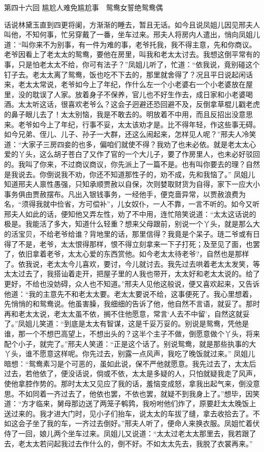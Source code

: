 \documentclass[12pt,oneside]{book}
\begin{document}
 
第四十六回  尴尬人难免尴尬事　鸳鸯女誓绝鸳鸯偶


话说林黛玉直到四更将阑，方渐渐的睡去，暂且无话。如今且说凤姐儿因见邢夫人叫他，不知何事，忙另穿戴了一番，坐车过来。邢夫人将房内人遣出，悄向凤姐儿道：“叫你来不为别事，有一件为难的事，老爷托我，我不得主意，先和你商议。老爷因看上了老太太的鸳鸯，要他在房里，叫我和老太太讨去。我想这倒平常有的事，只是怕老太太不给，你可有法子？”凤姐儿听了，忙道：“依我说，竟别碰这个钉子去。老太太离了鸳鸯，饭也吃不下去的，那里就舍得了？况且平日说起闲话来，老太太常说，老爷如今上了年纪，作什么左一个小老婆右一个小老婆放在屋里，没的耽误了人家。放着身子不保养，官儿也不好生作去，成日家和小老婆喝酒。太太听这话，很喜欢老爷么？这会子迥避还恐回避不及，反倒拿草棍儿戳老虎的鼻子眼儿去了！太太别恼，我是不敢去的。明放着不中用，而且反招出没意思来。老爷如今上了年纪，行事不妥，太太该劝才是。比不得年轻，作这些事无碍。如今兄弟、侄儿、儿子、孙子一大群，还这么闹起来，怎样见人呢？”邢夫人冷笑道：“大家子三房四妾的也多，偏咱们就使不得？我劝了也未必依。就是老太太心爱的丫头，这么胡子苍白了又作了官的一个大儿子，要了作房里人，也未必好驳回的。我叫了你来，不过商议商议，你先派上了一篇不是。也有叫你要去的理？自然是我说去。你倒说我不劝，你还不知道那性子的，劝不成，先和我恼了。”
凤姐儿知道邢夫人禀性愚强，只知承顺贾赦以自保，次则婪取财货为自得，家下一应大小事务俱由贾赦摆布。凡出入银钱事务，一经他手，便克啬异常，以贾赦浪费为名，“须得我就中俭省，方可偿补”，儿女奴仆，一人不靠，一言不听的。如今又听邢夫人如此的话，便知他又弄左性，劝了不中用，连忙陪笑说道：“太太这话说的极是。我能活了多大，知道什么轻重？想来父母跟前，别说一个丫头，就是那么大的活宝贝，不给老爷给谁？背地里的话，那里信得？我竟是个呆子。琏二爷或有日得了不是，老爷，太太恨得那样，恨不得立刻拿来一下子打死；及至见了面，也罢了，依旧拿着老爷，太太心爱的东西赏他。如今老太太待老爷?，自然也是那样了。依我说，老太太今儿喜欢，要讨，今儿就讨去。我先过去哄着老太太发笑，等太太过去了，我搭讪着走开，把屋子里的人我也带开，太太好和老太太说的。给了更好，不给也没妨碍，众人也不知道。”邢夫人见他这般说，便又喜欢起来，又告诉他道：“我的主意先不和老太太要。老太太要说不给，这事便死了。我心里想着，先悄悄的和鸳鸯说。他虽害臊，我细细的告诉了他，他自然不言语，就妥了。那时再和老太太说，老太太虽不依，搁不住他愿意，常言‘人去不中留’，自然这就妥了。”凤姐儿笑道：“到底是太太有智谋，这是千妥万妥的。别说是鸳鸯，凭他是谁，那一个不想巴高望上，不想出头的？这半个主子不做，倒愿意做个丫头，将来配个小子，就完了。”邢夫人笑道：“正是这个话了。别说鸳鸯，就是那些执事的大丫头，谁不愿意这样呢。你先过去，别露一点风声，我吃了晚饭就过来。”
凤姐儿暗想：“鸳鸯素习是个可恶的，虽如此说，保不严他就愿意。我先过去了，太太后过去，若他依了，便没话说，倘或不依，太太是多疑的人，只怕就疑我走了风声，使他拿腔作势的。那时太太又见应了我的话，羞恼变成怒，拿我出起气来，倒没意思。不如同着一齐过去了，他依也罢，不依也罢，就疑不到我身上了。”想毕，因笑道：“方才临来，舅母那边送了两笼子鹌鹑，我吩咐他们炸了，原要赶太太晚饭上送过来的。我才进大门时，见小子们抬车，说太太的车拔了缝，拿去收拾去了。不如这会子坐了我的车，一齐过去倒好。”邢夫人听了，便命人来换衣服。凤姐忙着伏侍了一回，娘儿两个坐车过来。凤姐儿又说道：“太太过老太太那里去，我若跟了去，老太太若问起我过去作什么的，倒不好。不如太太先去，我脱了衣裳再来。”
\end{document}

